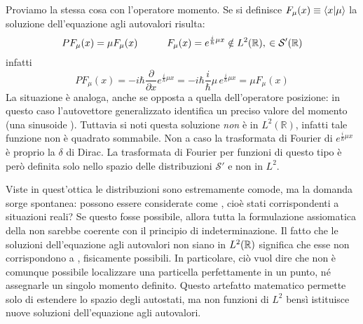 \documentclass[../../FisicaTeorica.tex]{subfiles}
\begin{document}
Proviamo la stessa cosa con l'operatore momento. Se si definisce $F_\mu(x) \equiv \braket{x|\mu}$ la soluzione dell'equazione agli autovalori risulta:
\[
P F_\mu(x) = \mu F_\mu(x) \qquad \quad F_\mu(x) = e^{\frac{i}{\hbar}\mu x} \notin L^2(\mathbb{R}),\> \in \mathcal{S}'(\mathbb{R})
\] %
infatti
\[
P F_{\mu}(x) = - i \hbar \frac{\partial}{\partial x} e^{\frac{i}{\hbar} \mu x} = - i \hbar \frac{i}{\hbar} \mu \, e^{\frac{i}{\hbar} \mu x} = \mu F_{\mu}(x)
\]
La situazione è analoga, anche se opposta a quella dell'operatore posizione: in questo caso l'autovettore generalizzato identifica un preciso valore del momento (una sinusoide ). Tuttavia si noti questa soluzione \emph{non} è in $L^2(\mathbb R)$, infatti tale funzione non è quadrato sommabile. Non a caso la trasformata di Fourier di $e^{\frac{i}{\hbar}\mu x}$ è proprio la $\delta$ di Dirac. La trasformata di Fourier per funzioni di questo tipo è però definita solo nello spazio delle distribuzioni $\mathcal S'$ e non in $L^2$.

Viste in quest'ottica le distribuzioni sono estremamente comode, ma la domanda sorge spontanea: possono essere considerate come , cioè stati corrispondenti a situazioni reali? Se questo fosse possibile, allora tutta la formulazione assiomatica della \MQ non sarebbe coerente con il principio di indeterminazione. Il fatto che le soluzioni dell'equazione agli autovalori non siano in $L^2(\mathbb{R})$ significa che esse non corrispondono a , fisicamente possibili. In particolare, ciò vuol dire che non è comunque possibile localizzare una particella perfettamente in un punto, né assegnarle un singolo momento definito.
Questo artefatto matematico permette solo di estendere lo spazio degli autostati, ma non  funzioni di $L^2$ bensì istituisce nuove soluzioni  dell'equazione agli autovalori.
\end{document}
